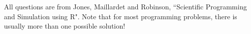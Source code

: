 \documentclass[11pt]{exam}
\begin{document}
\begin{center} 
\end{center} 

\lstset{language=Python,numbers=left}

\vspace{0.1in} 

All questions are from Jones, Maillardet and Robinson, ``Scientific Programming and Simulation using R". Note that for most programming problems, there is usually more than one possible solution!
\end{document}

